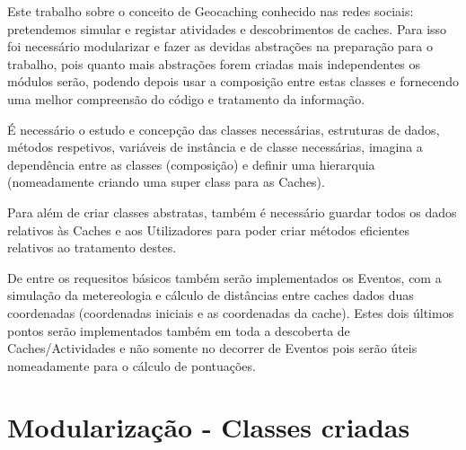 \documentclass{article}
\begin{document}
\quad
Este trabalho sobre o conceito de Geocaching conhecido nas redes sociais: pretendemos simular
e registar atividades e descobrimentos de caches. Para isso foi necessário modularizar e fazer
as devidas abstrações na preparação para o trabalho, pois quanto mais abstrações forem criadas
mais independentes os módulos serão, podendo depois usar a composição entre estas classes e
fornecendo uma melhor compreensão do código e tratamento da informação.
\par
É necessário o estudo e concepção das classes necessárias, estruturas de dados, métodos
respetivos, variáveis de instância e de classe necessárias, imagina a dependência entre
as classes (composição) e definir uma hierarquia (nomeadamente criando uma super
class para as Caches).
\par Para além de criar classes abstratas, também é necessário guardar todos os dados relativos
às Caches e aos Utilizadores para poder criar métodos eficientes relativos ao tratamento
destes.
\par De entre os requesitos básicos também serão implementados os Eventos, com a simulação
da metereologia e cálculo de distâncias entre caches dados duas coordenadas (coordenadas
iniciais e as coordenadas da cache). Estes dois últimos pontos serão implementados também
em toda a descoberta de Caches/Actividades e não somente no decorrer de Eventos pois serão
úteis nomeadamente para o cálculo de pontuações.
\pagebreak


\section{Modularização - Classes criadas}
\end{document}
